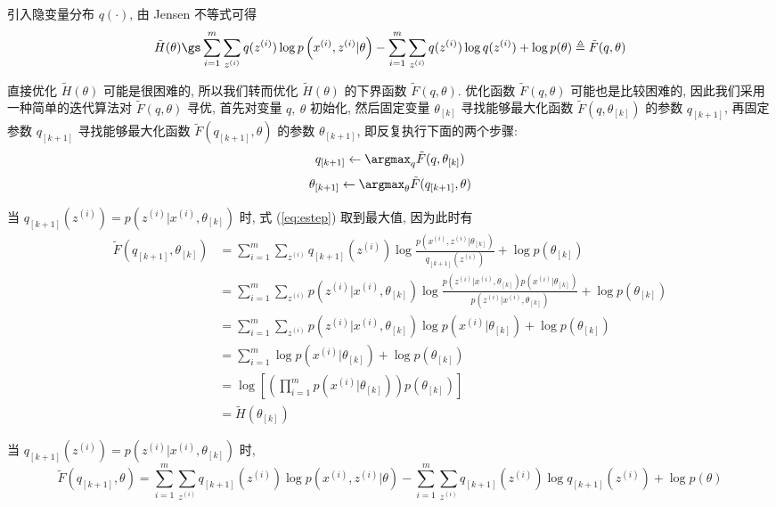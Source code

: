 \documentclass[openany]{ctexbook}
\theoremstyle{kaiti}
\theoremstyle{normal}
\begin{document}
引入隐变量分布 $q(\cdot)$, 由 Jensen 不等式可得
\begin{equation}
  \tilde{H}(\theta)
  \gs\sum_{i=1}^m\sum_{z^{(i)}}q(z^{(i)})\log p\left(x^{(i)},z^{(i)}|\theta\right)-\sum_{i=1}^m\sum_{z^{(i)}}q(z^{(i)})\log q(z^{(i)})+\log p(\theta)
  \triangleq \tilde{F}(q,\theta)
\end{equation}

直接优化 $\tilde{H}(\theta)$ 可能是很困难的, 所以我们转而优化 $\tilde{H}(\theta)$ 的下界函数 $\tilde{F}(q,\theta)$. 优化函数 $\tilde{F}(q,\theta)$ 可能也是比较困难的, 因此我们采用一种简单的迭代算法对 $\tilde{F}(q,\theta)$ 寻优, 首先对变量 $q,~\theta$ 初始化, 然后固定变量 $\theta_{[k]}$ 寻找能够最大化函数 $\tilde{F}(q,\theta_{[k]})$ 的参数 $q_{[k+1]}$, 再固定参数 $q_{[k+1]}$ 寻找能够最大化函数 $\tilde{F}(q_{[k+1]},\theta)$ 的参数 $\theta_{[k+1]}$, 即反复执行下面的两个步骤:
\begin{equation}
  q_{[k+1]}\leftarrow\argmax_{q}\tilde{F}(q,\theta_{[k]})
  \label{eq:estep}
\end{equation}
\begin{equation}
  \theta_{[k+1]}\leftarrow\argmax_{\theta}\tilde{F}(q_{[k+1]},\theta)
\end{equation}

当 $q_{[k+1]}(z^{(i)})=p(z^{(i)}|x^{(i)},\theta_{[k]})$ 时, 式 (\ref{eq:estep}) 取到最大值, 因为此时有
\begin{equation}
  \begin{aligned}
    \tilde{F}(q_{[k+1]},\theta_{[k]})
    &=\sum_{i=1}^m\sum_{z^{(i)}}q_{[k+1]}(z^{(i)})\log \frac{p\left(x^{(i)},z^{(i)}|\theta_{[k]}\right)}{q_{[k+1]}(z^{(i)})}+\log p(\theta_{[k]})\\
    &=\sum_{i=1}^m\sum_{z^{(i)}}p(z^{(i)}|x^{(i)},\theta_{[k]})\log \frac{p(z^{(i)}|x^{(i)},\theta_{[k]})p(x^{(i)}|\theta_{[k]})}{p(z^{(i)}|x^{(i)},\theta_{[k]})}+\log p(\theta_{[k]})\\
    &=\sum_{i=1}^m\sum_{z^{(i)}}p(z^{(i)}|x^{(i)},\theta_{[k]})\log p(x^{(i)}|\theta_{[k]})+\log p(\theta_{[k]})\\
    &=\sum_{i=1}^m\log p(x^{(i)}|\theta_{[k]})+\log p(\theta_{[k]})\\
    &=\log\left[\left(\prod_{i = 1}^mp(x^{(i)}|\theta_{[k]})\right)p(\theta_{[k]})\right]\\
    &=\tilde{H}(\theta_{[k]})
  \end{aligned}
  \label{eq:posterior}
\end{equation}

当 $q_{[k+1]}(z^{(i)})=p(z^{(i)}|x^{(i)},\theta_{[k]})$ 时, 
\begin{equation}
  \tilde{F}(q_{[k+1]},\theta)=\sum_{i=1}^m\sum_{z^{(i)}}q_{[k+1]}(z^{(i)})\log p\left(x^{(i)},z^{(i)}|\theta\right)-\sum_{i=1}^m\sum_{z^{(i)}}q_{[k+1]}(z^{(i)})\log q_{[k+1]}(z^{(i)})+\log p(\theta)
\end{equation}
\end{document}
